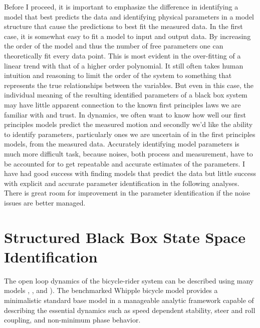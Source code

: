 \documentclass[a4paper]{article}
\begin{document}
Before I proceed, it is important to emphasize the difference in identifying a
model that best predicts the data and identifying physical parameters in a
model structure that cause the predictions to best fit the measured data. In
the first case, it is somewhat easy to fit a model to input and output data. By
increasing the order of the model and thus the number of free parameters one
can theoretically fit every data point. This is most evident in the
over-fitting of a linear trend with that of a higher order polynomial. It still
often takes human intuition and reasoning to limit the order of the system to
something that represents the true relationships between the variables. But
even in this case, the individual meaning of the resulting identified
parameters of a black box system may have little apparent connection to the
known first principles laws we are familiar with and trust. In dynamics, we
often want to know how well our first principles models predict the measured
motion and secondly we'd like the ability to identify parameters, particularly
ones we are uncertain of in the first principles models, from the measured
data. Accurately identifying model parameters is much more difficult task,
because noises, both process and measurement, have to be accounted for to get
repeatable and accurate estimates of the parameters. I have had good success
with finding models that predict the data but little success with explicit and
accurate parameter identification in the following analyses. There is great
room for improvement in the parameter identification if the noise issues are
better managed. %

\section{Structured Black Box State Space Identification}

The open loop dynamics of the bicycle-rider system can be described using many
models \cite{Astrom2005}, \cite{Limebeer2006}, and \cite{Meijaard2007} ). The 
benchmarked Whipple bicycle model \cite{Meijaard2007}
provides a minimalistic standard base model in a manageable analytic framework capable
of describing the essential dynamics such as speed dependent
stability, steer and roll coupling, and non-minimum phase behavior. 
\end{document}
